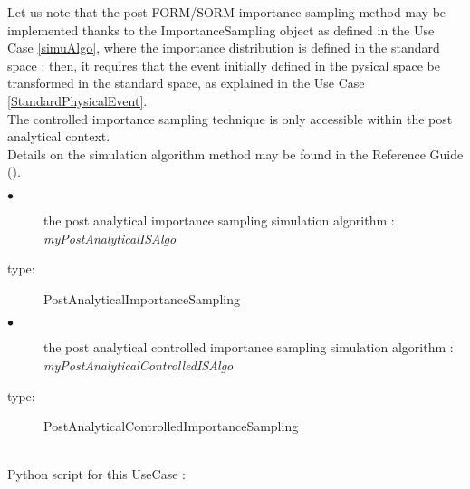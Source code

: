 Let us note that the post FORM/SORM importance sampling method may be implemented thanks to the ImportanceSampling object as defined in the Use Case \ref{simuAlgo}, where the importance distribution is defined in the standard space : then, it requires that the event initially defined in the pysical space be transformed in the standard space, as explained in the Use Case \ref{StandardPhysicalEvent}.\\
The controlled importance sampling technique is only accessible within the post analytical context.\\


Details on the simulation algorithm method may be found in the Reference Guide ().\\

             {
               \begin{description}
               \item[$\bullet$] the post analytical importance sampling simulation algorithm : {\itshape myPostAnalyticalISAlgo}
               \item[type:] PostAnalyticalImportanceSampling
               \item[$\bullet$] the post analytical controlled importance sampling simulation algorithm : {\itshape myPostAnalyticalControlledISAlgo}
               \item[type:] PostAnalyticalControlledImportanceSampling
               \end{description}
             }


             \textspace\\
             Python script for this UseCase :

